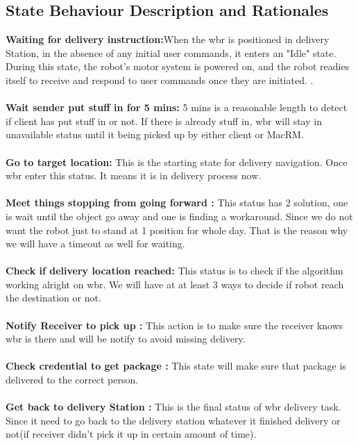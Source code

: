 \documentclass[12pt]{article}
\begin{document}
\subsection{State Behaviour Description and Rationales}
\noindent\textbf{Waiting for delivery instruction:}When the \acrshort{wbr} is positioned in delivery Station, in the absence of any initial user commands, it enters an "Idle" state. During this state, the robot's motor system is powered on, and the robot readies itself to receive and respond to user commands once they are initiated. .  \\\\
\noindent\textbf{Wait sender put stuff in for 5 mins:} 5 mins is a reasonable length to detect if client has put stuff in or not. If there is already stuff in, \acrshort{wbr} will stay in unavailable status until it being picked up by either client or MacRM.  \\\\
\textbf{Go to target location:} This is the starting state for delivery navigation. Once \acrshort{wbr} enter this status. It means it is in delivery process now.  \\\\
\textbf{Meet things stopping from going forward :} This status has 2 solution, one is wait until the object go away and one is finding a workaround. Since we do not want the robot just to stand at 1 position for whole day. That is the reason why we will have a timeout as well for waiting. \\\\
\textbf{Check if delivery location reached:} This status is to check if the algorithm working alright on \acrshort{wbr}. We will have at at least 3 ways to decide if robot reach the destination or not. \\\\
\textbf{Notify Receiver to pick up :} This action is to make sure the receiver knows \acrshort{wbr} is there and will be notify to avoid missing delivery.  \\\\
\textbf{Check credential to get package :} This state will make sure that package is delivered to the correct person.  \\\\
\textbf{Get back to delivery Station :} This is the final status of \acrshort{wbr} delivery task. Since it need to go back to the delivery station whatever it finished delivery or not(if receiver didn't pick it up in certain amount of time).\\\\
\end{document}

